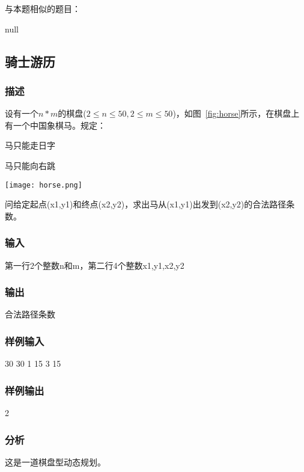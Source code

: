 与本题相似的题目：
\begindot
\item  null
\myenddot


\subsection{骑士游历}

\subsubsection{描述}
设有一个$n*m$的棋盘($2 \leq n \leq 50, 2 \leq m \leq 50$)，如图~\ref{fig:horse}所示，在棋盘上有一个中国象棋马。规定：
\begindot
\item 马只能走日字
\item 马只能向右跳
\myenddot

\begin{center}
\texttt{[image: horse.png]} \\
\label{fig:horse}
\end{center}

问给定起点(x1,y1)和终点(x2,y2)，求出马从(x1,y1)出发到(x2,y2)的合法路径条数。

\subsubsection{输入}
第一行2个整数n和m，第二行4个整数x1,y1,x2,y2

\subsubsection{输出}
合法路径条数

\subsubsection{样例输入}
\begin{Code}
30 30
1 15 3 15
\end{Code}

\subsubsection{样例输出}
\begin{Code}
2
\end{Code}

\subsubsection{分析}
这是一道棋盘型动态规划。

